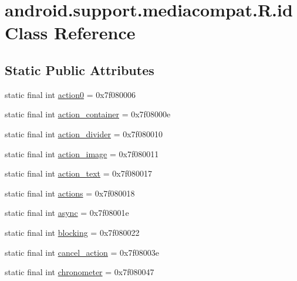 \hypertarget{classandroid_1_1support_1_1mediacompat_1_1_r_1_1id}{}\section{android.\+support.\+mediacompat.\+R.\+id Class Reference}
\label{classandroid_1_1support_1_1mediacompat_1_1_r_1_1id}
\subsection*{Static Public Attributes}
\begin{DoxyCompactItemize}
\item 
static final int \mbox{\hyperlink{classandroid_1_1support_1_1mediacompat_1_1_r_1_1id_a0d129d7ff0edd3bb3cf6a74f736656cb}{action0}} = 0x7f080006
\item 
static final int \mbox{\hyperlink{classandroid_1_1support_1_1mediacompat_1_1_r_1_1id_a89d378fa3c49f2d17cfd27b0e9109485}{action\+\_\+container}} = 0x7f08000e
\item 
static final int \mbox{\hyperlink{classandroid_1_1support_1_1mediacompat_1_1_r_1_1id_a26eba072923f374514cf98b6be9ad972}{action\+\_\+divider}} = 0x7f080010
\item 
static final int \mbox{\hyperlink{classandroid_1_1support_1_1mediacompat_1_1_r_1_1id_a750d59c19458781a09100408ad29d103}{action\+\_\+image}} = 0x7f080011
\item 
static final int \mbox{\hyperlink{classandroid_1_1support_1_1mediacompat_1_1_r_1_1id_af301b0fa42d008b5a7c1aa86787ed39a}{action\+\_\+text}} = 0x7f080017
\item 
static final int \mbox{\hyperlink{classandroid_1_1support_1_1mediacompat_1_1_r_1_1id_ad97d7132771263bce1d2a994b2efcfc5}{actions}} = 0x7f080018
\item 
static final int \mbox{\hyperlink{classandroid_1_1support_1_1mediacompat_1_1_r_1_1id_a15c518d0493a2fb5c512d706c3f5bef9}{async}} = 0x7f08001e
\item 
static final int \mbox{\hyperlink{classandroid_1_1support_1_1mediacompat_1_1_r_1_1id_a7fbbad697c566515ce403c3a387aa835}{blocking}} = 0x7f080022
\item 
static final int \mbox{\hyperlink{classandroid_1_1support_1_1mediacompat_1_1_r_1_1id_a0e699f14dcc347ec3e7b40c64783d053}{cancel\+\_\+action}} = 0x7f08003e
\item 
static final int \mbox{\hyperlink{classandroid_1_1support_1_1mediacompat_1_1_r_1_1id_ab3482c1acf38c737d255781505aecd9f}{chronometer}} = 0x7f080047

\end{DoxyCompactItemize}
